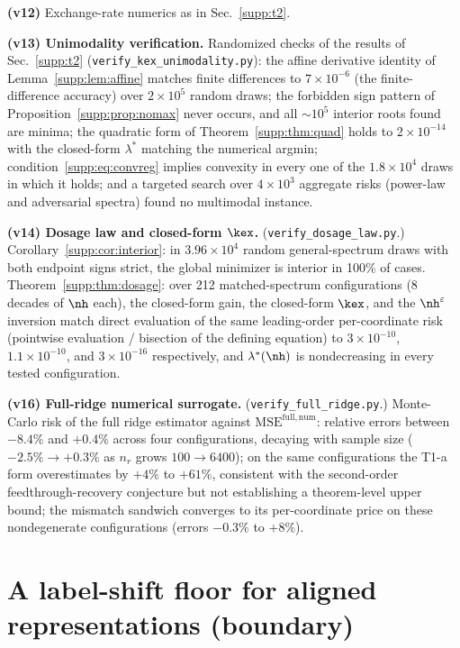 \textbf{(v12)} Exchange-rate numerics as in Sec.~\ref{supp:t2}.

\textbf{(v13) Unimodality verification.} Randomized checks of the results of Sec.~\ref{supp:t2} (\texttt{verify\_kex\_unimodality.py}): the affine derivative identity of Lemma~\ref{supp:lem:affine} matches finite differences to $7\times10^{-6}$ (the finite-difference accuracy) over $2\times10^5$ random draws; the forbidden sign pattern of Proposition~\ref{supp:prop:nomax} never occurs, and all $\sim10^5$ interior roots found are minima; the quadratic form of Theorem~\ref{supp:thm:quad} holds to $2\times10^{-14}$ with the closed-form $\lambda^*$ matching the numerical argmin; condition~\eqref{supp:eq:convreg} implies convexity in every one of the $1.8\times10^4$ draws in which it holds; and a targeted search over $4\times10^3$ aggregate risks (power-law and adversarial spectra) found no multimodal instance.

\textbf{(v14) Dosage law and closed-form $\kex$.} (\texttt{verify\_dosage\_law.py}.) Corollary~\ref{supp:cor:interior}: in $3.96\times10^4$ random general-spectrum draws with both endpoint signs strict, the global minimizer is interior in 100\% of cases. Theorem~\ref{supp:thm:dosage}: over 212 matched-spectrum configurations (8 decades of $\nh$ each), the closed-form gain, the closed-form $\kex$, and the $\nh^\varepsilon$ inversion match direct evaluation of the same leading-order per-coordinate risk (pointwise evaluation / bisection of the defining equation) to $3\times10^{-10}$, $1.1\times10^{-10}$, and $3\times10^{-16}$ respectively, and $\lambda^*(\nh)$ is nondecreasing in every tested configuration.

\textbf{(v16) Full-ridge numerical surrogate.} (\texttt{verify\_full\_ridge.py}.) Monte-Carlo risk of the full ridge estimator against $\mathrm{MSE}^{\mathrm{full,num}}$: relative errors between $-8.4\%$ and $+0.4\%$ across four configurations, decaying with sample size ($-2.5\% \to +0.3\%$ as $n_r$ grows $100 \to 6400$); on the same configurations the T1-a form overestimates by $+4\%$ to $+61\%$, consistent with the second-order feedthrough-recovery conjecture but not establishing a theorem-level upper bound; the mismatch sandwich converges to its per-coordinate price on these nondegenerate configurations (errors $-0.3\%$ to $+8\%$).

\section{A label-shift floor for aligned representations (boundary)}
\label{supp:zhao}

